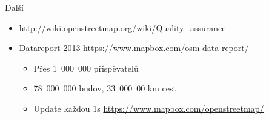 \documentclass[xcolor=dvipsnames]{beamer}
\begin{document}
\begin{frame}{Další}
\begin{itemize}
    \item
    \href{http://wiki.openstreetmap.org/wiki/Quality\_assurance}{http://wiki.openstreetmap.org/wiki/Quality\_assurance}
    \item Datareport 2013 \href{https://www.mapbox.com/osm-data-report/}{https://www.mapbox.com/osm-data-report/}
        \begin{itemize}
            \item Přes 1~000~000 přispěvatelů
            \item 78~000~000 budov, 33~000~00 km cest
            \item Update každou 1s \href{https://www.mapbox.com/openstreetmap/}{https://www.mapbox.com/openstreetmap/}
        \end{itemize}
\end{itemize}
\end{frame}
\end{document}
